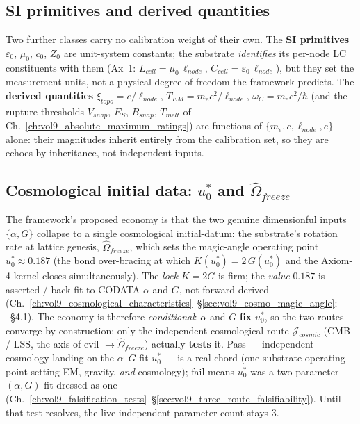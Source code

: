 \subsection{SI primitives and derived quantities}
\label{subsec:vol9_calib_si_derived}

Two further classes carry no calibration weight of their own. The \textbf{SI primitives} $\varepsilon_0$, $\mu_0$, $c_0$, $Z_0$ are unit-system constants; the substrate \emph{identifies} its per-node LC constituents with them (Ax~1: $L_{cell} = \mu_0\,\ell_{node}$, $C_{cell} = \varepsilon_0\,\ell_{node}$), but they set the measurement units, not a physical degree of freedom the framework predicts. The \textbf{derived quantities} $\xi_{topo} = e/\ell_{node}$, $T_{EM} = m_e c^2/\ell_{node}$, $\omega_C = m_e c^2/\hbar$ (and the rupture thresholds $V_{snap}$, $E_S$, $B_{snap}$, $T_{melt}$ of Ch.~\ref{ch:vol9_absolute_maximum_ratings}) are functions of $\{m_e, c, \ell_{node}, e\}$ alone: their magnitudes inherit entirely from the calibration set, so they are echoes by inheritance, not independent inputs.

\subsection{Cosmological initial data: $u_0^*$ and $\hat{\Omega}_{freeze}$}
\label{subsec:vol9_calib_cosmo}

The framework's proposed economy is that the two genuine dimensionful inputs $\{\alpha, G\}$ collapse to a single cosmological initial-datum: the substrate's rotation rate at lattice genesis, $\hat{\Omega}_{freeze}$, which sets the magic-angle operating point $u_0^* \approx 0.187$ (the bond over-bracing at which $K(u_0^*) = 2\,G(u_0^*)$ and the Axiom-4 kernel closes simultaneously). The \emph{lock} $K = 2G$ is firm; the \emph{value} $0.187$ is asserted / back-fit to CODATA $\alpha$ and $G$, not forward-derived (Ch.~\ref{ch:vol9_cosmological_characteristics}~\S\ref{sec:vol9_cosmo_magic_angle}; ~\S4.1). The economy is therefore \emph{conditional}: $\alpha$ and $G$ \textbf{fix} $u_0^*$, so the two routes converge by construction; only the independent cosmological route $\mathcal{J}_{cosmic}$ (CMB / LSS, the axis-of-evil $\to \hat{\Omega}_{freeze}$) actually \textbf{tests} it. Pass --- independent cosmology landing on the $\alpha$--$G$-fit $u_0^*$ --- is a real chord (one substrate operating point setting EM, gravity, \emph{and} cosmology); fail means $u_0^*$ was a two-parameter $(\alpha, G)$ fit dressed as one (Ch.~\ref{ch:vol9_falsification_tests}~\S\ref{sec:vol9_three_route_falsifiability}). Until that test resolves, the live independent-parameter count stays $3$.

